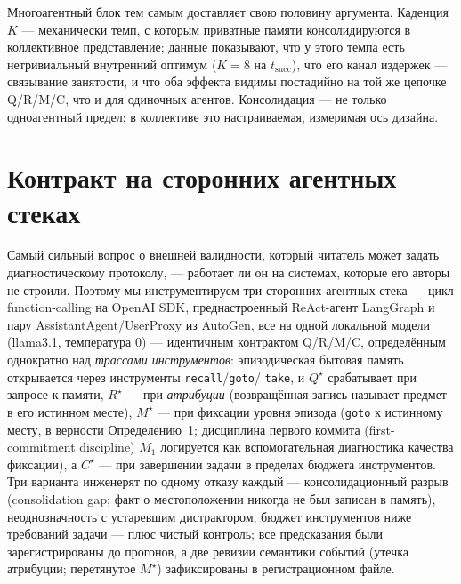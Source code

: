 \documentclass{article}
\newcommand{\method}[1]{\texttt{#1}}
\begin{document}
Многоагентный блок тем самым доставляет свою половину аргумента.
Каденция $K$ --- механически темп, с которым приватные памяти
консолидируются в коллективное представление; данные показывают, что у этого темпа есть
нетривиальный внутренний оптимум ($K\!=\!8$ на $t_{\mathrm{succ}}$), что
его канал издержек --- связывание занятости, и что оба эффекта
видимы постадийно на той же цепочке Q/R/M/C, что и для одиночных
агентов. Консолидация --- не только одноагентный предел; в
коллективе это настраиваемая, измеримая ось дизайна.

\section{Контракт на сторонних агентных стеках}
\label{p1:sec:external}

Самый сильный вопрос о внешней валидности, который читатель может задать
диагностическому протоколу, --- работает ли он на системах, которые его авторы не
строили. Поэтому мы инструментируем три сторонних агентных стека --- цикл
function-calling на OpenAI SDK, преднастроенный ReAct-агент
LangGraph и пару AssistantAgent/UserProxy из AutoGen, все на одной
локальной модели (llama3.1, температура $0$) --- идентичным
контрактом Q/R/M/C, определённым однократно над \emph{трассами инструментов}: эпизодическая
бытовая память открывается через инструменты \method{recall}/\method{goto}/%
\method{take}, и $Q^\star$ срабатывает при запросе к памяти, $R^\star$ ---
при \emph{атрибуции} (возвращённая запись называет предмет в его истинном
месте), $M^\star$ --- при фиксации уровня эпизода (\method{goto} к
истинному месту, в верности Определению~1; дисциплина первого коммита (first-commitment discipline)
$M_1$ логируется как вспомогательная диагностика качества фиксации), а
$C^\star$ --- при завершении задачи в пределах бюджета инструментов. Три варианта
инженерят по одному отказу каждый --- консолидационный разрыв (consolidation gap; факт о местоположении
никогда не был записан в память), неоднозначность с устаревшим дистрактором, бюджет
инструментов ниже требований задачи --- плюс чистый контроль; все
предсказания были зарегистрированы до прогонов, а две ревизии
семантики событий (утечка атрибуции; перетянутое $M^\star$)
зафиксированы в регистрационном файле.
\end{document}

